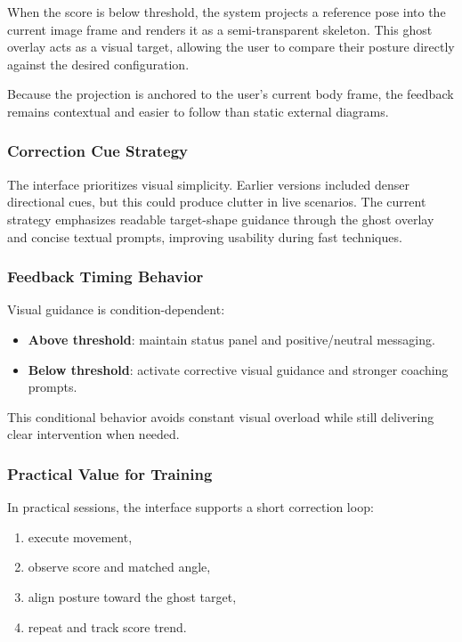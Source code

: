 \documentclass[12pt]{article}
\begin{document}
{When the score is below threshold, the system projects a reference pose into the current image frame and renders it as a semi-transparent skeleton. This ghost overlay acts as a visual target, allowing the user to compare their posture directly against the desired configuration.

Because the projection is anchored to the user's current body frame, the feedback remains contextual and easier to follow than static external diagrams.

\subsubsection{Correction Cue Strategy}

The interface prioritizes visual simplicity. Earlier versions included denser directional cues, but this could produce clutter in live scenarios. The current strategy emphasizes readable target-shape guidance through the ghost overlay and concise textual prompts, improving usability during fast techniques.

\subsubsection{Feedback Timing Behavior}

Visual guidance is condition-dependent:

\begin{itemize}
    \item \textbf{Above threshold}: maintain status panel and positive/neutral messaging.
    \item \textbf{Below threshold}: activate corrective visual guidance and stronger coaching prompts.
\end{itemize}

This conditional behavior avoids constant visual overload while still delivering clear intervention when needed.

\subsubsection{Practical Value for Training}

In practical sessions, the interface supports a short correction loop:

\begin{enumerate}
    \item execute movement,
    \item observe score and matched angle,
    \item align posture toward the ghost target,
    \item repeat and track score trend.
\end{enumerate}

}
\end{document}
